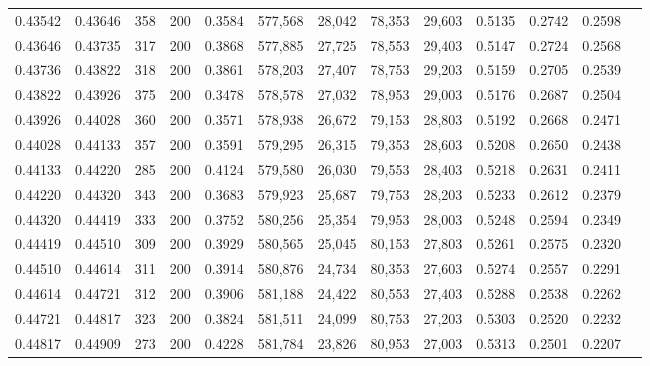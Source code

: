 \begin{tabular}{rrrrrrrrrrrrr}
0.43542 & 0.43646 &    358 & 200 &                                     0.3584 & 577,568 &  28,042 &  78,353 &  29,603 & 0.5135 & 0.2742 & 0.2598 \\
0.43646 & 0.43735 &    317 & 200 &                                     0.3868 & 577,885 &  27,725 &  78,553 &  29,403 & 0.5147 & 0.2724 & 0.2568 \\
0.43736 & 0.43822 &    318 & 200 &                                     0.3861 & 578,203 &  27,407 &  78,753 &  29,203 & 0.5159 & 0.2705 & 0.2539 \\
0.43822 & 0.43926 &    375 & 200 &                                     0.3478 & 578,578 &  27,032 &  78,953 &  29,003 & 0.5176 & 0.2687 & 0.2504 \\
0.43926 & 0.44028 &    360 & 200 &                                     0.3571 & 578,938 &  26,672 &  79,153 &  28,803 & 0.5192 & 0.2668 & 0.2471 \\
0.44028 & 0.44133 &    357 & 200 &                                     0.3591 & 579,295 &  26,315 &  79,353 &  28,603 & 0.5208 & 0.2650 & 0.2438 \\
0.44133 & 0.44220 &    285 & 200 &                                     0.4124 & 579,580 &  26,030 &  79,553 &  28,403 & 0.5218 & 0.2631 & 0.2411 \\
0.44220 & 0.44320 &    343 & 200 &                                     0.3683 & 579,923 &  25,687 &  79,753 &  28,203 & 0.5233 & 0.2612 & 0.2379 \\
0.44320 & 0.44419 &    333 & 200 &                                     0.3752 & 580,256 &  25,354 &  79,953 &  28,003 & 0.5248 & 0.2594 & 0.2349 \\
0.44419 & 0.44510 &    309 & 200 &                                     0.3929 & 580,565 &  25,045 &  80,153 &  27,803 & 0.5261 & 0.2575 & 0.2320 \\
0.44510 & 0.44614 &    311 & 200 &                                     0.3914 & 580,876 &  24,734 &  80,353 &  27,603 & 0.5274 & 0.2557 & 0.2291 \\
0.44614 & 0.44721 &    312 & 200 &                                     0.3906 & 581,188 &  24,422 &  80,553 &  27,403 & 0.5288 & 0.2538 & 0.2262 \\
0.44721 & 0.44817 &    323 & 200 &                                     0.3824 & 581,511 &  24,099 &  80,753 &  27,203 & 0.5303 & 0.2520 & 0.2232 \\
0.44817 & 0.44909 &    273 & 200 &                                     0.4228 & 581,784 &  23,826 &  80,953 &  27,003 & 0.5313 & 0.2501 & 0.2207 \\

\end{tabular}

